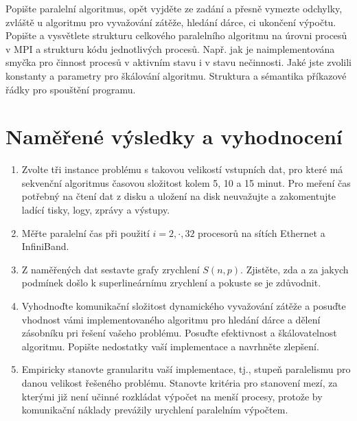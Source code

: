 \documentclass[12pt]{article}
\begin{document}
Popište paralelní algoritmus, opět vyjděte ze zadání a přesně
vymezte odchylky, zvláště u algoritmu pro vyvažování zátěže, hledání
dárce, ci ukončení výpočtu.  Popište a vysvětlete strukturu
celkového paralelního algoritmu na úrovni procesů v MPI a strukturu
kódu jednotlivých procesů. Např. jak je naimplementována smyčka pro
činnost procesů v aktivním stavu i v stavu nečinnosti. Jaké jste
zvolili konstanty a parametry pro škálování algoritmu. Struktura a
sémantika příkazové řádky pro spouštění programu.

\section{Naměřené výsledky a vyhodnocení}

\begin{enumerate}
\item Zvolte tři instance problému s takovou velikostí vstupních dat, pro které má
sekvenční algoritmus časovou složitost kolem 5, 10 a 15 minut. Pro
meření čas potřebný na čtení dat z disku a uložení na disk
neuvažujte a zakomentujte ladící tisky, logy, zprávy a výstupy.
\item Měřte paralelní čas při použití $i=2,\cdot,32$ procesorů na sítích Ethernet a InfiniBand.
\item Z naměřených dat sestavte grafy zrychlení $S(n,p)$. Zjistěte, zda a za jakych podmínek
došlo k superlineárnímu zrychlení a pokuste se je zdůvodnit.
\item Vyhodnoďte komunikační složitost dynamického vyvažování zátěže a posuďte
vhodnost vámi implementovaného algoritmu pro hledání dárce a dělení
zásobníku pri řešení vašeho problému. Posuďte efektivnost a
škálovatelnost algoritmu. Popište nedostatky vaší implementace a
navrhněte zlepšení.
\item Empiricky stanovte
granularitu vaší implementace, tj., stupeň paralelismu pro danou
velikost řešeného problému. Stanovte kritéria pro stanovení mezí, za
kterými již není učinné rozkládat výpočet na menší procesy, protože
by komunikační náklady prevážily urychlení paralelním výpočtem.

\end{enumerate}
\end{document}
